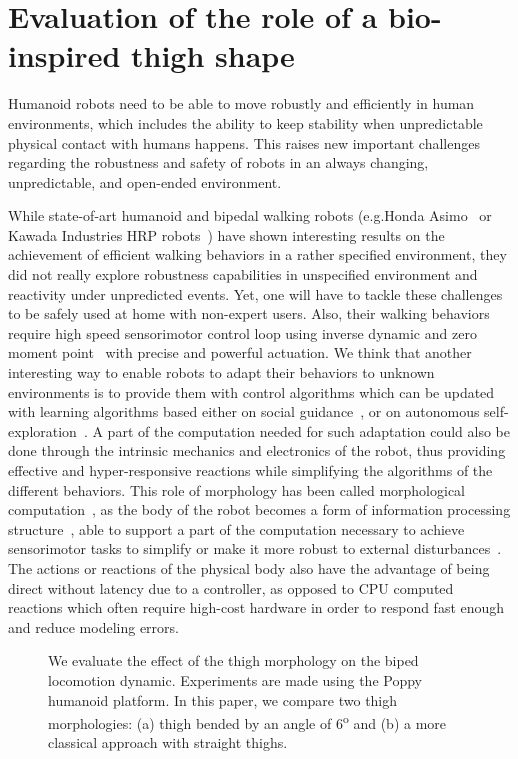 
\section{Evaluation of the role of a bio-inspired thigh shape} %
\label{sec:evaluation-thigh}
Humanoid robots need to be able to move robustly and efficiently in human environments, which includes the ability to keep stability when unpredictable physical contact with humans happens.
This raises new important challenges regarding the robustness and safety of robots in an always changing, unpredictable, and open-ended environment.

While state-of-art humanoid and bipedal walking robots (e.g.Honda Asimo~\cite{hirai1998development} or Kawada Industries HRP robots~\cite{kaneko2008humanoid}) have shown interesting results on the achievement of efficient walking behaviors in a rather specified environment, they did not really explore robustness capabilities in unspecified environment and reactivity under unpredicted events.
Yet, one will have to tackle these challenges to be safely used at home with non-expert users.
Also, their walking behaviors require high speed sensorimotor control loop using inverse dynamic and zero moment point~\cite{kajita2003biped} with precise and powerful actuation.
We think that another interesting way to enable robots to adapt their behaviors to unknown environments is to provide them with control algorithms which can be updated with learning algorithms based either on social guidance~\cite{billard2008robot}, or on autonomous self-exploration~\cite{Baranes2012RAS}.
A part of the computation needed for such adaptation could also be done through the intrinsic mechanics and electronics of the robot, thus providing effective and hyper-responsive reactions while simplifying the algorithms of the different behaviors.
This role of morphology has been called morphological computation~\cite{pfeifer2005morphological}, as the body of the robot becomes a form of information processing structure~\cite{Pfeifer06}, able to support a part of the computation necessary to achieve sensorimotor tasks to simplify or make it more robust to external disturbances~\cite{Pfeifer07}.
The actions or reactions of the physical body also have the advantage of being direct without latency due to a controller, as opposed to CPU computed reactions which often require high-cost hardware in order to respond fast enough and reduce modeling errors.


\begin{figure}[!t]
\centering
    \hfil
    \caption{We evaluate the effect of the thigh morphology on the biped locomotion dynamic.
    Experiments are made using the Poppy humanoid platform.
    In this paper, we compare two thigh morphologies: (a) thigh bended by an angle of 6\textsuperscript{o} and (b) a more classical approach with straight thighs.}
    \label{fig:poppy_compared}
\end{figure}

